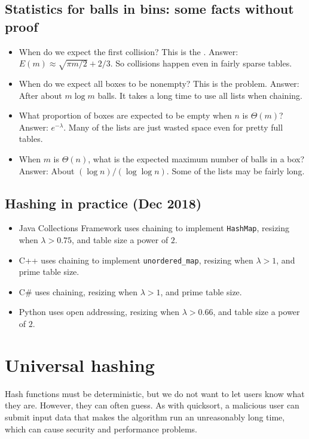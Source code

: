 \section{Statistics for balls in bins: some facts without proof}
\begin{itemize}
\item When do we expect the first collision? This is the . 
Answer: $E(m) \approx \sqrt{\pi m/2} + 2/3$.
So collisions happen even in fairly sparse tables.
\item When do we expect all boxes to be nonempty? 
This is the  problem. Answer: After about $m \log m$ balls. 
It takes a long time to use all lists when chaining.
\item What proportion of boxes are expected to be empty when $n$ is $\Theta(m)$? 
Answer: $e^{-\lambda}$. Many of the lists are just wasted space even for 
pretty full tables.
\item When $m$ is $\Theta(n)$, what is the expected maximum number of balls in a box? 
Answer: About $(\log n)/(\log \log n)$. Some of the lists may be fairly long. 
\end{itemize}

\section{Hashing in practice (Dec 2018)}
\begin{itemize}
\item Java Collections Framework uses chaining to implement \texttt{HashMap}, resizing when $\lambda > 0.75$, and table size a power of $2$.
\item C++  uses chaining to implement \texttt{unordered\_map}, resizing when $\lambda >1$, and prime table size.
\item C\# uses chaining, resizing when $\lambda > 1$, and prime table size.
\item Python uses open addressing, resizing when $\lambda > 0.66$, and table size a power of $2$.
\end{itemize}



\chapter{Universal hashing} %
Hash functions must be deterministic, but we do not want to let users know what they are. 
However, they can often guess. As with quicksort, a malicious user can submit input data that makes the 
algorithm run an unreasonably long time, which can cause security and performance problems.

